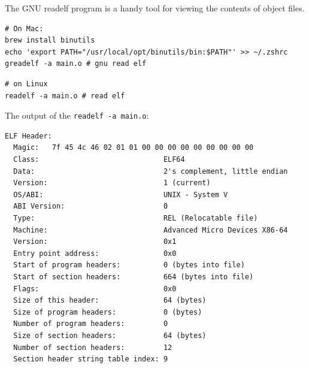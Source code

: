 \documentclass[11pt]{article}
\begin{document}
The GNU readelf program is a handy tool for viewing the contents of object files.\\
\begin{verbatim}
# On Mac:
brew install binutils
echo 'export PATH="/usr/local/opt/binutils/bin:$PATH"' >> ~/.zshrc
greadelf -a main.o # gnu read elf
\end{verbatim}

\begin{verbatim}
# on Linux
readelf -a main.o # read elf
\end{verbatim}

The output of the \texttt{readelf -a main.o}:\\
\begin{verbatim}
ELF Header:
  Magic:   7f 45 4c 46 02 01 01 00 00 00 00 00 00 00 00 00 
  Class:                             ELF64
  Data:                              2's complement, little endian
  Version:                           1 (current)
  OS/ABI:                            UNIX - System V
  ABI Version:                       0
  Type:                              REL (Relocatable file)
  Machine:                           Advanced Micro Devices X86-64
  Version:                           0x1
  Entry point address:               0x0
  Start of program headers:          0 (bytes into file)
  Start of section headers:          664 (bytes into file)
  Flags:                             0x0
  Size of this header:               64 (bytes)
  Size of program headers:           0 (bytes)
  Number of program headers:         0
  Size of section headers:           64 (bytes)
  Number of section headers:         12
  Section header string table index: 9


\end{verbatim}
\end{document}
